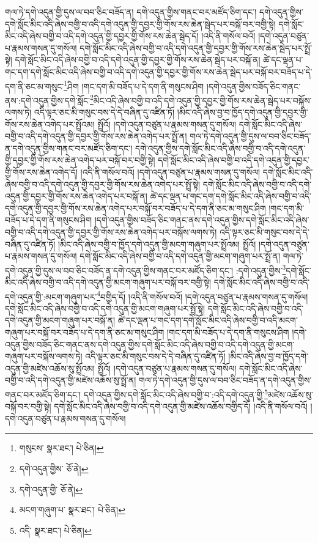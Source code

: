 གལ་ཏེ་དགེ་འདུན་གྱི་དུས་ལ་བབ་ཅིང་བཟོད་ན། དགེ་འདུན་གྱིས་གནང་བར་མཛོད་ཅིག་དང་། དགེ་འདུན་གྱིས་དགེ་སློང་མིང་འདི་ཞེས་བགྱི་བ་འདི་དགེ་འདུན་གྱི་དབྱར་གྱི་གོས་རས་ཆེན་སྦེད་པར་བསྐོ་བར་བགྱི་སྟེ། དགེ་སློང་མིང་འདི་ཞེས་བགྱི་བ་འདི་དགེ་འདུན་གྱི་དབྱར་གྱི་གོས་རས་ཆེན་སྦེད་དོ། །འདི་ནི་གསོལ་བའོ། །དགེ་འདུན་བཙུན་པ་རྣམས་གསན་དུ་གསོལ། དགེ་སློང་མིང་འདི་ཞེས་བགྱི་བ་འདི་དགེ་འདུན་གྱི་དབྱར་གྱི་གོས་རས་ཆེན་སྦེད་པར་སྤྲོ་སྟེ། དགེ་སློང་མིང་འདི་ཞེས་བགྱི་བ་འདི་དགེ་འདུན་གྱི་དབྱར་གྱི་གོས་རས་ཆེན་སྦེད་པར་བསྐོ་ན། ཚེ་དང་ལྡན་པ་གང་དག་དགེ་སློང་མིང་འདི་ཞེས་བགྱི་བ་འདི་དགེ་འདུན་གྱི་དབྱར་གྱི་གོས་རས་ཆེན་སྦེད་པར་བསྐོ་བར་བཟོད་པ་དེ་དག་ནི་ཅང་མ་གསུང་\footnote{གསུངས་  སྣར་ཐང་།  པེ་ཅིན། }ཤིག །གང་དག་མི་བཟོད་པ་དེ་དག་ནི་གསུངས་ཤིག །དགེ་འདུན་གྱིས་བཟོད་ཅིང་གནང་ནས་:དགེ་འདུན་གྱིས་དགེ་སློང་\footnote{དགེ་འདུན་གྱིས་  ཅོ་ནེ། }མིང་འདི་ཞེས་བགྱི་བ་འདི་དགེ་འདུན་གྱི་དབྱར་གྱི་གོས་རས་ཆེན་སྦེད་པར་བསྐོས་ལགས་ཏེ། འདི་ལྟར་ཅང་མི་གསུང་བས་དེ་དེ་བཞིན་དུ་འཛིན་ཏོ། །མིང་འདི་ཞེས་བྱ་བ་ཁྱོད་དགེ་འདུན་གྱི་དབྱར་གྱི་གོས་རས་ཆེན་འགེད་པར་སྤྲོའམ། སྤྲོའོ། །དགེ་འདུན་བཙུན་པ་རྣམས་གསན་དུ་གསོལ། དགེ་སློང་མིང་འདི་ཞེས་བགྱི་བ་འདི་དགེ་འདུན་གྱི་དབྱར་གྱི་གོས་རས་ཆེན་འགེད་པར་སྤྲོ་ན། གལ་ཏེ་དགེ་འདུན་གྱི་དུས་ལ་བབ་ཅིང་བཟོད་ན་དགེ་འདུན་གྱིས་གནང་བར་མཛོད་ཅིག་དང་། དགེ་འདུན་གྱིས་དགེ་སློང་མིང་འདི་ཞེས་བགྱི་བ་འདི་དགེ་འདུན་གྱི་དབྱར་གྱི་གོས་རས་ཆེན་འགེད་པར་བསྐོ་བར་བགྱི་སྟེ། དགེ་སློང་མིང་འདི་ཞེས་བགྱི་བ་འདི་དགེ་འདུན་གྱི་དབྱར་གྱི་གོས་རས་ཆེན་འགེད་དོ། །འདི་ནི་གསོལ་བའོ། །དགེ་འདུན་བཙུན་པ་རྣམས་གསན་དུ་གསོལ། དགེ་སློང་མིང་འདི་ཞེས་བགྱི་བ་འདི་དགེ་འདུན་གྱི་དབྱར་གྱི་གོས་རས་ཆེན་འགེད་པར་སྤྲོ་སྟེ། དགེ་སློང་མིང་འདི་ཞེས་བགྱི་བ་འདི་དགེ་འདུན་གྱི་དབྱར་གྱི་གོས་རས་ཆེན་འགེད་པར་བསྐོ་ན། ཚེ་དང་ལྡན་པ་གང་དག་དགེ་སློང་མིང་འདི་ཞེས་བགྱི་བ་འདི་དགེ་འདུན་གྱི་དབྱར་གྱི་གོས་རས་ཆེན་འགེད་པར་བསྐོ་བར་བཟོད་པ་དེ་དག་ནི་ཅང་མ་གསུང་ཤིག །གང་དག་མི་བཟོད་པ་དེ་དག་ནི་གསུངས་ཤིག །དགེ་འདུན་གྱིས་བཟོད་ཅིང་གནང་ནས་དགེ་འདུན་གྱིས་དགེ་སློང་མིང་འདི་ཞེས་བགྱི་བ་འདི་དགེ་འདུན་གྱི་དབྱར་གྱི་གོས་རས་ཆེན་འགེད་པར་བསྐོས་ལགས་ཏེ། འདི་ལྟར་ཅང་མི་གསུང་བས་དེ་དེ་བཞིན་དུ་འཛིན་ཏོ། །མིང་འདི་ཞེས་བགྱི་བ་ཁྱོད་དགེ་འདུན་གྱི་མངག་གཞུག་པར་སྤྲོའམ། སྤྲོའོ། །དགེ་འདུན་བཙུན་པ་རྣམས་གསན་དུ་གསོལ། དགེ་སློང་མིང་འདི་ཞེས་བགྱི་བ་འདི་དགེ་འདུན་གྱི་མངག་གཞུག་པར་སྤྲོ་ན། གལ་ཏེ་དགེ་འདུན་གྱི་དུས་ལ་བབ་ཅིང་བཟོད་ན་དགེ་འདུན་གྱིས་གནང་བར་མཛོད་ཅིག་དང་། :དགེ་འདུན་གྱིས་\footnote{དགེ་འདུན་གྱི་  ཅོ་ནེ། }དགེ་སློང་མིང་འདི་ཞེས་བགྱི་བ་འདི་དགེ་འདུན་གྱི་མངག་གཞུག་པར་བསྐོ་བར་བགྱི་སྟེ། དགེ་སློང་མིང་འདི་ཞེས་བགྱི་བ་འདི་དགེ་འདུན་གྱི་:མངག་གཞུག་པར་\footnote{མངག་གཞུག་པ་  སྣར་ཐང་།  པེ་ཅིན། }བགྱིད་དོ། །འདི་ནི་གསོལ་བའོ། །དགེ་འདུན་བཙུན་པ་རྣམས་གསན་དུ་གསོལ། དགེ་སློང་མིང་འདི་ཞེས་བགྱི་བ་འདི་དགེ་འདུན་གྱི་མངག་གཞུག་པར་སྤྲོ་སྟེ། དགེ་སློང་མིང་འདི་ཞེས་བགྱི་བ་འདི་དགེ་འདུན་གྱི་མངག་གཞུག་པར་བསྐོ་ན། ཚེ་དང་ལྡན་པ་གང་དག་དགེ་སློང་མིང་འདི་ཞེས་བགྱི་བ་འདི་མངག་གཞུག་པར་བསྐོ་བར་བཟོད་པ་དེ་དག་ནི་ཅང་མ་གསུང་ཤིག །གང་དག་མི་བཟོད་པ་དེ་དག་ནི་གསུངས་ཤིག །དགེ་འདུན་གྱིས་བཟོད་ཅིང་གནང་ནས་དགེ་འདུན་གྱིས་དགེ་སློང་མིང་འདི་ཞེས་བགྱི་བ་འདི་དགེ་འདུན་གྱི་མངག་གཞུག་པར་བསྐོས་ལགས་ཏེ། འདི་ལྟར་ཅང་མི་གསུང་བས་དེ་དེ་བཞིན་དུ་འཛིན་ཏོ། །མིང་འདི་ཞེས་བྱ་བ་ཁྱོད་དགེ་འདུན་གྱི་མཛེས་འཆོས་སུ་སྤྲོའམ། སྤྲོའོ། །དགེ་འདུན་བཙུན་པ་རྣམས་གསན་དུ་གསོལ། དགེ་སློང་མིང་འདི་ཞེས་བགྱི་བ་འདི་དགེ་འདུན་གྱི་མཛེས་འཆོས་སུ་སྤྲོ་ན། གལ་ཏེ་དགེ་འདུན་གྱི་དུས་ལ་བབ་ཅིང་བཟོད་ན་དགེ་འདུན་གྱིས་གནང་བར་མཛོད་ཅིག་དང་། དགེ་འདུན་གྱིས་དགེ་སློང་མིང་འདི་ཞེས་བགྱི་བ་:འདི་དགེ་འདུན་གྱི་\footnote{འདི་  སྣར་ཐང་།  པེ་ཅིན། }མཛེས་འཆོས་སུ་བསྐོ་བར་བགྱི་སྟེ། དགེ་སློང་མིང་འདི་ཞེས་བགྱི་བ་འདི་དགེ་འདུན་གྱི་མཛེས་འཆོས་བགྱིད་དོ། །འདི་ནི་གསོལ་བའོ། །དགེ་འདུན་བཙུན་པ་རྣམས་གསན་དུ་གསོལ། 